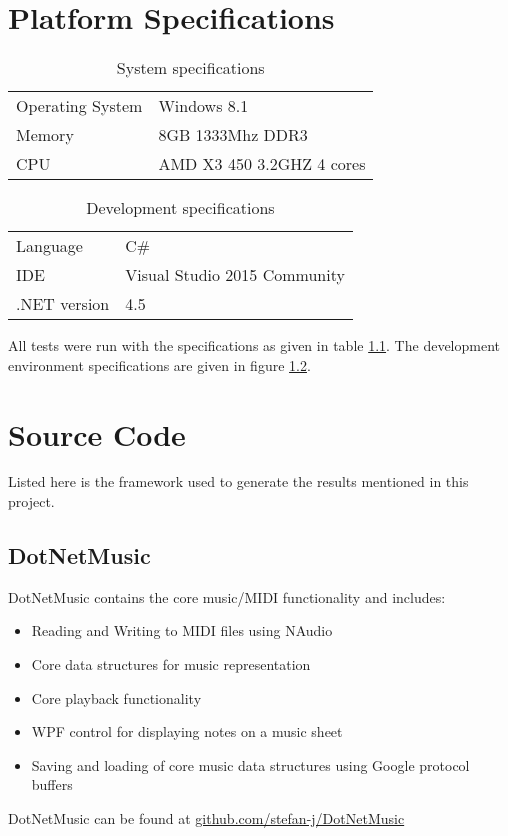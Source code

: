
\chapter{Platform Specifications}
\begin{table}[h!]
  \centering
  \caption{System specifications}
    \begin{tabular}{l|l}
    \toprule
    Operating System & Windows 8.1 \\
    Memory & 8GB 1333Mhz DDR3 \\
    CPU   & AMD X3 450 3.2GHZ 4 cores \\
    \bottomrule
    \end{tabular}%
  \label{tab:systemspecs}%
\end{table}%

\begin{table}[htbp]
  \centering
  \caption{Development specifications}
    \begin{tabular}{l|l}
    \toprule
    Language & C\# \\
    IDE   & Visual Studio 2015 Community \\
    .NET version & 4.5 \\
    \bottomrule
    \end{tabular}%
  \label{tab:languagespecs}%
\end{table}%


All tests were run with the specifications as given in table \ref{tab:systemspecs}. The development environment specifications are given in figure \ref{tab:languagespecs}.


\chapter{Source Code}
Listed here is the framework used to generate the results mentioned in this project.

\section{DotNetMusic}
DotNetMusic contains the core music/\ac{MIDI} functionality and includes:
\begin{itemize}
\item Reading and Writing to \ac{MIDI} files using NAudio
\item Core data structures for music representation
\item Core playback functionality
\item \ac{WPF} control for displaying notes on a music sheet
\item Saving and loading of core music data structures using Google protocol buffers
\end{itemize}
DotNetMusic can be found at \href{https://github.com/stefan-j/DotNetMusic}{github.com/stefan-j/DotNetMusic}

